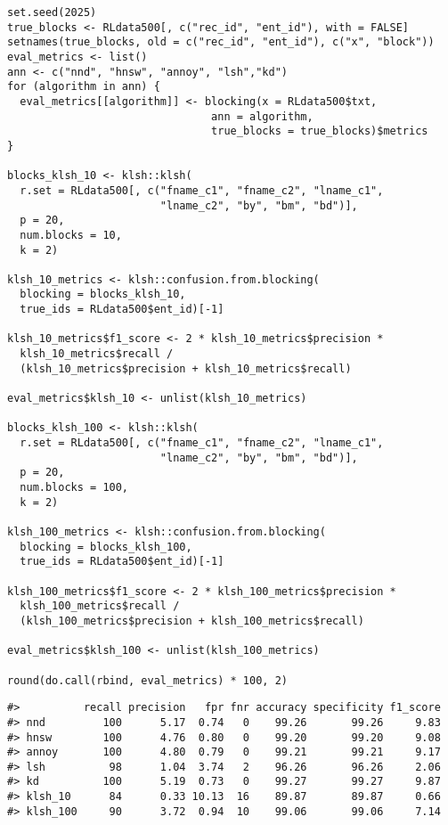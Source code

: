 \begin{verbatim}
set.seed(2025)
true_blocks <- RLdata500[, c("rec_id", "ent_id"), with = FALSE]
setnames(true_blocks, old = c("rec_id", "ent_id"), c("x", "block"))
eval_metrics <- list()
ann <- c("nnd", "hnsw", "annoy", "lsh","kd")
for (algorithm in ann) {
  eval_metrics[[algorithm]] <- blocking(x = RLdata500$txt,
                                ann = algorithm,
                                true_blocks = true_blocks)$metrics
}

blocks_klsh_10 <- klsh::klsh(
  r.set = RLdata500[, c("fname_c1", "fname_c2", "lname_c1",
                        "lname_c2", "by", "bm", "bd")],
  p = 20,
  num.blocks = 10,
  k = 2)

klsh_10_metrics <- klsh::confusion.from.blocking(
  blocking = blocks_klsh_10, 
  true_ids = RLdata500$ent_id)[-1]

klsh_10_metrics$f1_score <- 2 * klsh_10_metrics$precision *
  klsh_10_metrics$recall / 
  (klsh_10_metrics$precision + klsh_10_metrics$recall)

eval_metrics$klsh_10 <- unlist(klsh_10_metrics)

blocks_klsh_100 <- klsh::klsh(
  r.set = RLdata500[, c("fname_c1", "fname_c2", "lname_c1",
                        "lname_c2", "by", "bm", "bd")],
  p = 20,
  num.blocks = 100,
  k = 2)

klsh_100_metrics <- klsh::confusion.from.blocking(
  blocking = blocks_klsh_100, 
  true_ids = RLdata500$ent_id)[-1]

klsh_100_metrics$f1_score <- 2 * klsh_100_metrics$precision * 
  klsh_100_metrics$recall /
  (klsh_100_metrics$precision + klsh_100_metrics$recall)

eval_metrics$klsh_100 <- unlist(klsh_100_metrics)

round(do.call(rbind, eval_metrics) * 100, 2)
\end{verbatim}

\begin{verbatim}
#>          recall precision   fpr fnr accuracy specificity f1_score
#> nnd         100      5.17  0.74   0    99.26       99.26     9.83
#> hnsw        100      4.76  0.80   0    99.20       99.20     9.08
#> annoy       100      4.80  0.79   0    99.21       99.21     9.17
#> lsh          98      1.04  3.74   2    96.26       96.26     2.06
#> kd          100      5.19  0.73   0    99.27       99.27     9.87
#> klsh_10      84      0.33 10.13  16    89.87       89.87     0.66
#> klsh_100     90      3.72  0.94  10    99.06       99.06     7.14
\end{verbatim}

